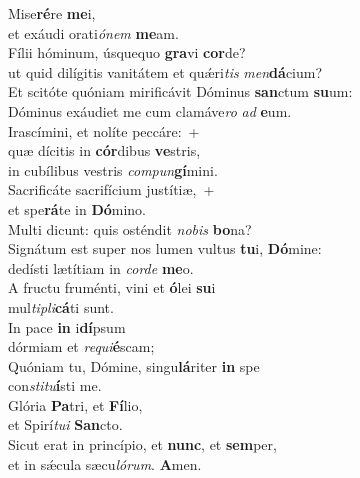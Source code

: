 \evenverse Mise\textbf{ré}re \textbf{me}i,~\*\\
\evenverse et exáudi orati\textit{ó}\textit{nem} \textbf{me}am.\\
\oddverse Fílii hóminum, úsquequo \textbf{gra}vi \textbf{cor}de?~\*\\
\oddverse ut quid dilígitis vanitátem et quǽri\textit{tis} \textit{men}\textbf{dá}cium?\\
\evenverse Et scitóte quóniam mirificávit Dóminus \textbf{san}ctum \textbf{su}um:~\*\\
\evenverse Dóminus exáudiet me cum clamáve\textit{ro} \textit{ad} \textbf{e}um.\\
\oddverse Irascímini, et nolíte peccáre:~+\\
\oddverse  quæ dícitis in \textbf{cór}dibus \textbf{ve}stris,~\*\\
\oddverse in cubílibus vestris \textit{com}\textit{pun}\textbf{gí}mini.\\
\evenverse Sacrificáte sacrifícium justítiæ,~+\\
\evenverse  et spe\textbf{rá}te in \textbf{Dó}mino.~\*\\
\evenverse Multi dicunt: quis osténdit \textit{no}\textit{bis} \textbf{bo}na?\\
\oddverse Signátum est super nos lumen vultus \textbf{tu}i, \textbf{Dó}mine:~\*\\
\oddverse dedísti lætítiam in \textit{cor}\textit{de} \textbf{me}o.\\
\evenverse A fructu fruménti, vini et \textbf{ó}lei \textbf{su}i~\*\\
\evenverse mul\textit{ti}\textit{pli}\textbf{cá}ti sunt.\\
\oddverse In pace \textbf{in} i\textbf{dí}psum~\*\\
\oddverse dórmiam et \textit{re}\textit{qui}\textbf{é}scam;\\
\evenverse Quóniam tu, Dómine, singu\textbf{lá}riter \textbf{in} spe~\*\\
\evenverse con\textit{sti}\textit{tu}\textbf{í}sti me.\\
\oddverse Glória \textbf{Pa}tri, et \textbf{Fí}lio,~\*\\
\oddverse et Spirí\textit{tu}\textit{i} \textbf{San}cto.\\
\evenverse Sicut erat in princípio, et \textbf{nunc}, et \textbf{sem}per,~\*\\
\evenverse et in sǽcula sæcu\textit{ló}\textit{rum}. \textbf{A}men.\\
